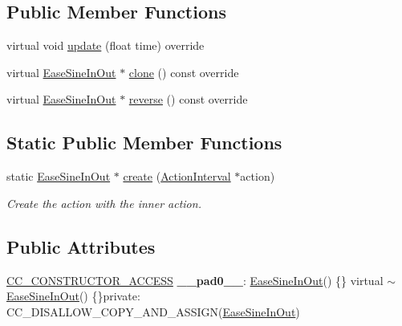 \subsection*{Public Member Functions}
\begin{DoxyCompactItemize}
\item 
virtual void \hyperlink{classEaseSineInOut_a6c5c73d3e2bfeb21315b2d9798cf562f}{update} (float time) override
\item 
virtual \hyperlink{classEaseSineInOut}{Ease\+Sine\+In\+Out} $\ast$ \hyperlink{classEaseSineInOut_a78a36c0d403d763d2d1c6a03a56a283c}{clone} () const override
\item 
virtual \hyperlink{classEaseSineInOut}{Ease\+Sine\+In\+Out} $\ast$ \hyperlink{classEaseSineInOut_aa8aba440311e86fcab00307d5359263d}{reverse} () const override
\end{DoxyCompactItemize}
\subsection*{Static Public Member Functions}
\begin{DoxyCompactItemize}
\item 
static \hyperlink{classEaseSineInOut}{Ease\+Sine\+In\+Out} $\ast$ \hyperlink{classEaseSineInOut_ace68076ff6bb84e0d1a52b40d8806685}{create} (\hyperlink{classActionInterval}{Action\+Interval} $\ast$action)
\begin{DoxyCompactList}\small\item\em Create the action with the inner action. \end{DoxyCompactList}\end{DoxyCompactItemize}
\subsection*{Public Attributes}
\begin{DoxyCompactItemize}
\item 
\mbox{\label{classEaseSineInOut_a1e2c9a0a3a2fa4677ba63c08f504b0e4}} 
\hyperlink{_2cocos2d_2cocos_2base_2ccConfig_8h_a25ef1314f97c35a2ed3d029b0ead6da0}{C\+C\+\_\+\+C\+O\+N\+S\+T\+R\+U\+C\+T\+O\+R\+\_\+\+A\+C\+C\+E\+SS} {\bfseries \+\_\+\+\_\+pad0\+\_\+\+\_\+}\+: \hyperlink{classEaseSineInOut}{Ease\+Sine\+In\+Out}() \{\} virtual $\sim$\hyperlink{classEaseSineInOut}{Ease\+Sine\+In\+Out}() \{\}private\+: C\+C\+\_\+\+D\+I\+S\+A\+L\+L\+O\+W\+\_\+\+C\+O\+P\+Y\+\_\+\+A\+N\+D\+\_\+\+A\+S\+S\+I\+GN(\hyperlink{classEaseSineInOut}{Ease\+Sine\+In\+Out})
\end{DoxyCompactItemize}
